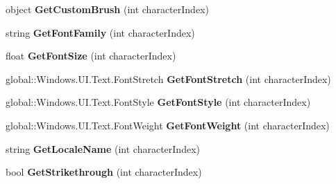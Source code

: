 \begin{DoxyCompactItemize}
object {\bfseries Get\+Custom\+Brush} (int character\+Index)
\item 
\mbox{\label{class_microsoft_1_1_graphics_1_1_canvas_1_1_text_1_1_canvas_text_layout_af4f53cf9d9dddc4bfa0669a57c6a4084}} 
string {\bfseries Get\+Font\+Family} (int character\+Index)
\item 
\mbox{\label{class_microsoft_1_1_graphics_1_1_canvas_1_1_text_1_1_canvas_text_layout_a0597b8dfd8edb6f68a71f116703648c7}} 
float {\bfseries Get\+Font\+Size} (int character\+Index)
\item 
\mbox{\label{class_microsoft_1_1_graphics_1_1_canvas_1_1_text_1_1_canvas_text_layout_a7ae8624ebdfdcb49fb9d365b6c8c6404}} 
global\+::\+Windows.\+U\+I.\+Text.\+Font\+Stretch {\bfseries Get\+Font\+Stretch} (int character\+Index)
\item 
\mbox{\label{class_microsoft_1_1_graphics_1_1_canvas_1_1_text_1_1_canvas_text_layout_a84a97afe4a7b871703795677195da761}} 
global\+::\+Windows.\+U\+I.\+Text.\+Font\+Style {\bfseries Get\+Font\+Style} (int character\+Index)
\item 
\mbox{\label{class_microsoft_1_1_graphics_1_1_canvas_1_1_text_1_1_canvas_text_layout_ad0c1b485da46a633fa7740206bc21f8f}} 
global\+::\+Windows.\+U\+I.\+Text.\+Font\+Weight {\bfseries Get\+Font\+Weight} (int character\+Index)
\item 
\mbox{\label{class_microsoft_1_1_graphics_1_1_canvas_1_1_text_1_1_canvas_text_layout_ad1e03e0c5fae952c5b9c1e2dc0efe6de}} 
string {\bfseries Get\+Locale\+Name} (int character\+Index)
\item 
\mbox{\label{class_microsoft_1_1_graphics_1_1_canvas_1_1_text_1_1_canvas_text_layout_ab63ecf60b01e515ff2edd6dc7d621cb6}} 
bool {\bfseries Get\+Strikethrough} (int character\+Index)

\end{DoxyCompactItemize}
